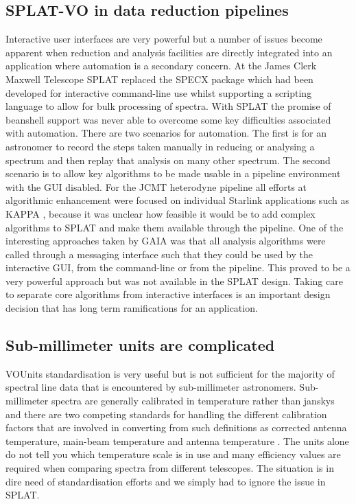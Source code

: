 \documentclass[final,authoryear,5p,times,twocolumn]{elsarticle}
\begin{document}
\subsection{SPLAT-VO in data reduction pipelines}

Interactive user interfaces are very powerful but a number of issues
become apparent when reduction and analysis facilities are directly
integrated into an application where automation is a secondary
concern.  At the James Clerk Maxwell Telescope SPLAT replaced the
SPECX package \citep[][]{specx} which had been
developed for interactive command-line use whilst supporting a
scripting language to allow for bulk processing of spectra. With SPLAT
the promise of beanshell support was never able to overcome some key
difficulties associated with automation. There are two scenarios for
automation. The first is for an astronomer to record the steps taken
manually in reducing or analysing a spectrum and then replay that
analysis on many other spectrum. The second scenario is to allow key
algorithms to be made usable in a pipeline environment with the GUI
disabled. For the JCMT heterodyne pipeline
\citep[][]{2008ASPC..394..565J,JennessACSISDR} all efforts at algorithmic
enhancement were focused on individual Starlink applications such as
KAPPA \citep[][]{sun95}, because it was unclear how
feasible it would be to add complex algorithms to SPLAT and make them
available through the pipeline. One of the interesting approaches
taken by GAIA \citep{2009ASPC..411..575D} was that all analysis
algorithms were called through a messaging interface such that they
could be used by the interactive GUI, from the command-line or from
the pipeline. This proved to be a very powerful approach but was not
available in the SPLAT design. Taking care to separate core algorithms
from interactive interfaces is an important design decision that has
long term ramifications for an application.

\subsection{Sub-millimeter units are complicated}

VOUnits \citep{vounits} standardisation is very useful but is not
sufficient for the majority of spectral line data that is encountered
by sub-millimeter astronomers. Sub-millimeter spectra are generally
calibrated in temperature rather than janskys and there are two
competing standards for handling the different calibration factors
that are involved in converting from such definitions as corrected
antenna temperature, main-beam temperature and antenna temperature
\citep{1981ApJ...250..341K,1989LNP...333..351D,2009tra..book.....W}. The
units alone do not tell you which temperature scale is in use and many
efficiency values are required when comparing spectra from different
telescopes. The situation is in dire need of standardisation efforts
and we simply had to ignore the issue in SPLAT.
\end{document}
